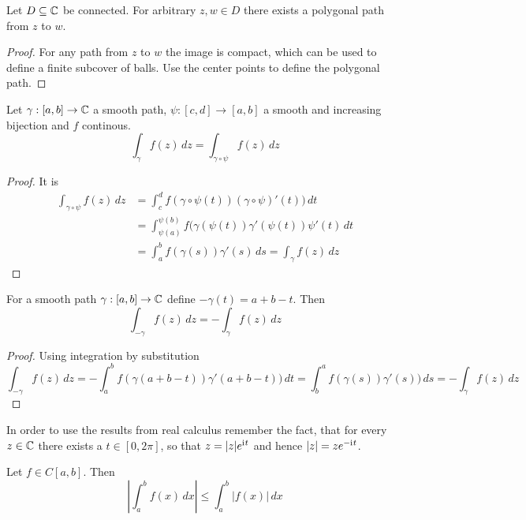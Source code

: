 \begin{definition}
\begin{lemma}
Let \( D \subseteq \mathbb{C} \) be connected. For arbitrary \( z, w \in D \) there exists a polygonal path from
\( z \) to \( w \).
\end{lemma}
\begin{proof} 
For any path from \( z \) to \( w \) the image is compact, which can be used to define a finite subcover of balls. 
Use the center points to define the polygonal path.
\end{proof}
\bigskip


\begin{lemma}
Let \( \gamma: [a,b] \to \mathbb{C} \) a smooth path, \( \psi: [c,d] \to [a,b] \) a smooth and increasing bijection 
and \( f \) continous.
	\[
		\int_{\gamma} f(z)\,dz = \int_{\gamma\circ\psi} f(z)\,dz
	\]
\end{lemma}

\begin{proof} It is 
	\[
		\begin{split}
			\int_{\gamma\circ\psi} f(z)\,dz
				 & = \int_c^d f(\gamma\circ\psi(t))(\gamma\circ\psi)'(t)) \,dt \\
				 & = \int_{\psi(a)}^{\psi(b)} f(\gamma(\psi(t))\gamma'(\psi(t))\psi'(t) \,dt \\
				 & = \int_a^b f(\gamma(s))\gamma'(s) \,ds = \int_{\gamma} f(z)\,dz
		\end{split}
	\]
\end{proof}
\bigskip


\begin{lemma}
For a smooth path \( \gamma: [a,b] \to \mathbb{C} \) define \(-\gamma(t) = a + b - t \).
Then
	\[
		\int_{-\gamma} f(z)\,dz = -\int_{\gamma} f(z)\,dz
	\]
\end{lemma}

\begin{proof} Using integration by substitution	 
	\[
		\int_{-\gamma} f(z)\,dz
			  = - \int_a^b f(\gamma(a + b - t))\gamma'(a + b - t)) \,dt 
			  = \int_b^a f(\gamma(s))\gamma'(s)) \,ds 
			  = - \int_{\gamma} f(z)\,dz
	\]
\end{proof}
\bigskip


In order to use the results from real calculus remember the fact, that for every \( z \in \mathbb{C} \) 
there exists a \( t \in [0,2\pi] \), so that \( z = |z|e^{\mathrm{i}\mkern1mu t} \) and hence \( |z| = ze^{-\mathrm{i}\mkern1mu t} \).
\bigskip


\begin{lemma}
Let \( f \in C[a,b] \). Then
	\[
		\left|\int_a^b f(x)\,dx \right| \le \int_a^b |f(x)|\,dx
	\]
\end{lemma}


\end{definition}
